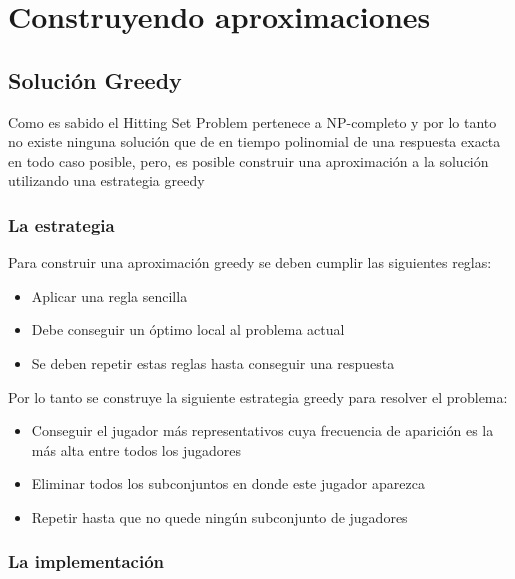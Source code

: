 \section{Construyendo aproximaciones}

\subsection{Solución Greedy}

Como es sabido el Hitting Set Problem pertenece a NP-completo y por lo tanto no existe ninguna solución que de en tiempo polinomial de una respuesta exacta en todo caso posible, pero, es posible construir una aproximación a la solución utilizando una estrategia greedy

\subsubsection{La estrategia}

Para construir una aproximación greedy se deben cumplir las siguientes reglas:

\begin{itemize}
    \item Aplicar una regla sencilla \\
    \item Debe conseguir un óptimo local al problema actual \\
    \item Se deben repetir estas reglas hasta conseguir una respuesta \\
\end{itemize}

Por lo tanto se construye la siguiente estrategia greedy para resolver el problema:

\begin{itemize}
    \item Conseguir el jugador más representativos cuya frecuencia de aparición es la más alta entre todos los jugadores \\
    \item Eliminar todos los subconjuntos en donde este jugador aparezca \\
    \item Repetir hasta que no quede ningún subconjunto de jugadores \\
\end{itemize}

\subsubsection{La implementación}

